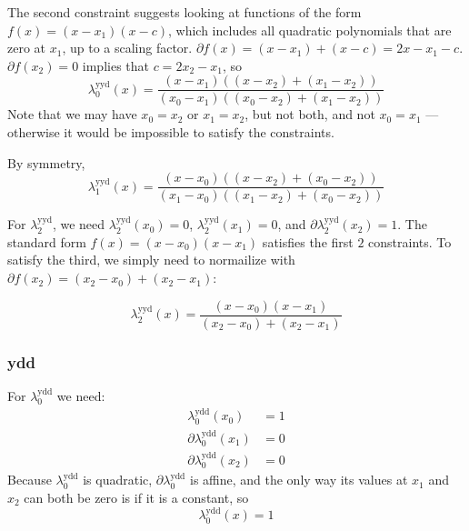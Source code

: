 The second constraint suggests looking at functions of the form
$f(x) = (x - x_1) (x - c)$, which includes all quadratic 
polynomials that are zero at $x_1$, up to a scaling factor.  
$\partial{f}(x) = (x - x_1) + (x - c) = 2 x - x_1 - c$.
$\partial{f}(x_2) = 0$ implies that
$c = 2 x_2 - x_1$,
so
\begin{equation}
\lambda^{\text{yyd}}_0(x) = 
\frac 
{(x - x_1) \left( (x - x_2) + (x_1 - x_2) \right)} 
{(x_0 - x_1) ((x_0 - x_2) + (x_1 - x_2))}
\end{equation}
Note that we may have $x_0 = x_2$ or $x_1 = x_2$, but not both,
and not $x_0 = x_1$ --- otherwise it would be impossible to 
satisfy the constraints.

By symmetry, 
\begin{equation}
\lambda^{\text{yyd}}_1(x) = 
\frac 
{(x - x_0) \left( (x - x_2) + (x_0 - x_2) \right)} 
{(x_1 - x_0) \left( (x_1 - x_2) + (x_0 - x_2) \right)}
\end{equation}

 For $\lambda^{\text{yyd}}_2$, we need 
$\lambda^{\text{yyd}}_2(x_0) = 0$, 
$\lambda^{\text{yyd}}_2(x_1) = 0$, and
$\partial\lambda^{\text{yyd}}_2(x_2) = 1$. 
The standard form $f(x) = (x-x_0) (x-x_1)$ satisfies the first 
$2$ constraints. 
To satisfy the third, we simply need to normailize with
$\partial{f}(x_2) = (x_2 - x_0) + (x_2 - x_1)$:

\begin{equation}
\lambda^{\text{yyd}}_2(x) = 
\frac 
{(x - x_0) (x - x_1)} 
{(x_2 - x_0) + (x_2 - x_1)}
\end{equation}

\subsubsection{ydd}\label{sec:lagrange-ydd}

For $\lambda^{\text{ydd}}_0$ we need:
\begin{align}
\lambda^{\text{ydd}}_0(x_0) & = 1 \\
\partial\lambda^{\text{ydd}}_0(x_1) & = 0 \nonumber \\
\partial\lambda^{\text{ydd}}_0(x_2) & = 0 \nonumber
\end{align}
Because $\lambda^{\text{ydd}}_0$ is quadratic,
$\partial\lambda^{\text{ydd}}_0$ is affine, 
and the only way its values
at $x_1$ and $x_2$ can both be zero is if it is a constant, so 
\begin{equation}
\lambda^{\text{ydd}}_0(x) = 1
\end{equation}

